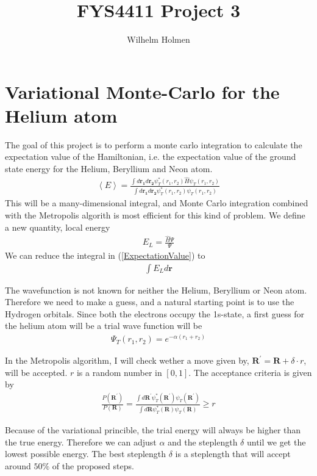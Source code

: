 \documentclass[a4paper, 12pt, titlepage]{article}
\author{Wilhelm Holmen}
\title{FYS4411 Project 3}
\begin{document}
 \maketitle
 \newpage

 \section*{Variational Monte-Carlo for the Helium atom}
 The goal of this project is to perform a monte carlo integration to calculate the expectation value of the Hamiltonian, i.e. the expectation value of the ground state energy for the Helium, Beryllium and Neon atom.  
 \begin{align}
 	\left< E \right> = \frac{\int d \mathbf{r_1} d \mathbf{r_2} \psi_T^*(r_1,r_2) \hat H \psi_T(r_1,r_2)}{\int d \mathbf{r_1} d \mathbf{r_2} \psi_T^*(r_1,r_2) \psi_T(r_1,r_2)}
 	\label{ExpectationValue}
 \end{align}
 This will be a many-dimensional integral, and Monte Carlo integration combined with the Metropolis algorith is most efficient for this kind of problem. We define a new quantity, local energy
 \begin{align*}
 	E_L = \frac{\hat H \Psi}{\Psi}
 \end{align*}
 We can reduce the integral in (\ref{ExpectationValue}) to 
 \begin{align}
 	\int E_L d \mathbf{r} 
 \end{align}

 The wavefunction is not known for neither the Helium, Beryllium or Neon atom. Therefore we need to make a guess, and a natural starting point is to use the Hydrogen orbitals. Since both the electrons occupy the 1s-state, a first guess for the helium atom will be a trial wave function will be
 \begin{align*}
 	\Psi_T(r_1,r_2) = e^{-\alpha(r_1 + r_2)}
 \end{align*}

 In the Metropolis algorithm, I will check wether a move given by, $\mathbf{R^{'}} = \mathbf{R} + \delta \cdot r $, will be accepted. $r$ is a random number in $[0,1]$. The acceptance criteria is given by
 \begin{align*}
 	\frac{P(\mathbf{R^{'}} )}{P(\mathbf{R} )} = \frac{\int d \mathbf{R^{'}} \psi^*_T(\mathbf{R^{'}} ) \psi_T(\mathbf{R^{'}} )}{\int d \mathbf{R} \psi^*_T(\mathbf{R}) \psi_T(\mathbf{R} )} \geq r
 \end{align*}

 Because of the variational princible, the trial energy will always be higher than the true energy. Therefore we can adjust $\alpha$ and the steplength $\delta$ until we get the lowest possible energy. The best steplength $\delta$ is a steplength that will accept around $50\%$ of the proposed steps. 
\end{document}
